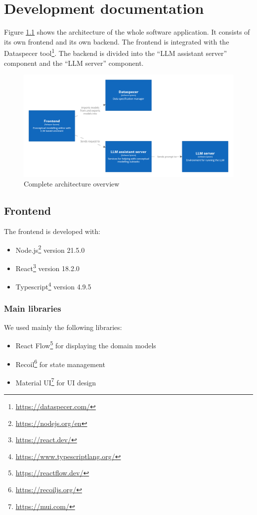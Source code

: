 \chapter{Development documentation}
\label{chap:development_documentation}

Figure \ref{fig:complete_overview} shows the architecture of the whole software application. It consists of its own frontend and its own backend. The frontend is integrated with the Dataspecer tool\footnote{\url{https://dataspecer.com/}}. The backend is divided into the ``LLM assistant server'' component and the ``LLM server'' component.

\begin{figure}[!h]
    \includegraphics[scale=0.20]{../docs/images/architecture/complete-overview.png}
    \caption{\centering Complete architecture overview}
    \label{fig:complete_overview}
\end{figure}

\section{Frontend}

\noindent{}The frontend is developed with:
\begin{itemize}
\item Node.js\footnote{\url{https://nodejs.org/en}} version 21.5.0
\item React\footnote{\url{https://react.dev/}} version 18.2.0
\item Typescript\footnote{\url{https://www.typescriptlang.org/}} version 4.9.5
\end{itemize}


\subsection{Main libraries}

\noindent{}We used mainly the following libraries:
\begin{itemize}
\item React Flow\footnote{\url{https://reactflow.dev/}} for displaying the domain models
\item Recoil\footnote{\url{https://recoiljs.org/}} for state management
\item Material UI\footnote{\url{https://mui.com/}} for UI design
\end{itemize}


